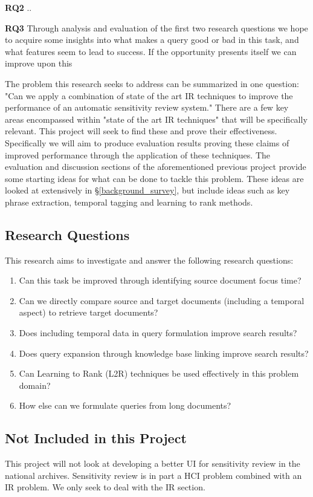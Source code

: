 \documentclass{mprop}
\begin{document}
\textbf{RQ2} ..

\textbf{RQ3} Through analysis and evaluation of the first two research questions we hope to acquire some insights into what makes a query good or bad in this task, and what features seem to lead to success. If the opportunity presents itself we can improve upon this

The problem this research seeks to address can be summarized in one question: "Can we apply a combination of state of the art IR techniques to improve the performance of an automatic sensitivity review system." There are a few key areas encompassed within "state of the art IR techniques" that will be specifically relevant. This project will seek to find these and prove their effectiveness. Specifically we will aim to produce evaluation results proving these claims of improved performance through the application of these techniques. The evaluation and discussion sections of the aforementioned previous project provide some starting ideas for what can be done to tackle this problem. These ideas are looked at extensively in \S \ref{background_survey}, but include ideas such as key phrase extraction, temporal tagging and learning to rank methods.

\subsection{Research Questions}
This research aims to investigate and answer the following research questions:
\begin{enumerate}[label=\textbf{RQ.\arabic*}]
\item Can this task be improved through identifying source document focus time?
\item Can we directly compare source and target documents (including a temporal aspect) to retrieve target documents?
\item Does including temporal data in query formulation improve search results?
\item Does query expansion through knowledge base linking improve search results?
\item Can Learning to Rank (L2R) techniques be used effectively in this problem domain?
\item How else can we formulate queries from long documents?
\end{enumerate}

\subsection{Not Included in this Project}
This project will not look at developing a better UI for sensitivity review in the national archives. Sensitivity review is in part a HCI problem combined with an IR problem. We only seek to deal with the IR section.
\end{document}
